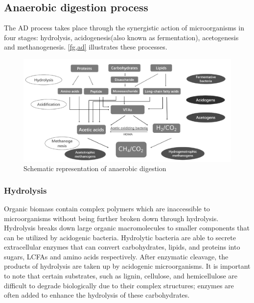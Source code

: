 \documentclass[fontsize=12pt,headsepline=true, bibliography=totocnumbered, twoside]{scrbook} %
\begin{document}
\subsection{Anaerobic digestion process}


The \ac{AD} process takes place through the synergistic action of microorganisms in four stages: hydrolysis, acidogenesis(also known as fermentation), acetogenesis and methanogenesis\citep{nayono}. \autoref{fg,ad} illustrates these processes.


\begin{figure}[h]
\center

\includegraphics[width=\textwidth]{img1}

\caption[Schematic representation of anaerobic digestion]{Schematic representation of anaerobic digestion\citep{chen}}
\label{fg,ad}
\end{figure}


\subsubsection{Hydrolysis}

Organic biomass contain complex polymers which are inaccessible to microorganisms without being further broken down through hydrolysis. Hydrolysis breaks down large organic macromolecules to smaller components that can be utilized by acidogenic bacteria.
Hydrolytic bacteria are able to secrete extracellular enzymes that can convert carbohydrates, lipids, and proteins into sugars, \ac{LCFAs} and amino acids respectively. After enzymatic cleavage, the products of hydrolysis are taken up by acidogenic microorganisms. It is important to note that certain substrates, such as lignin, cellulose, and hemicellulose are difficult to degrade biologically due to their complex structures; enzymes are often added to enhance the hydrolysis of these carbohydrates\citep{patel}.
\end{document}
